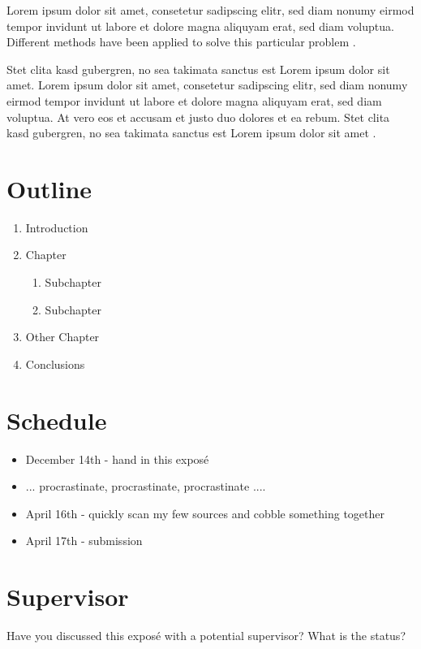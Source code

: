 \documentclass[12pt,a4paper]{article}
\begin{document}
Lorem ipsum dolor sit amet, consetetur sadipscing elitr, sed diam nonumy eirmod tempor invidunt ut labore et dolore magna aliquyam erat, sed diam voluptua. Different methods have been applied to solve this particular problem \autocite[]{McConnell:2004:CCS:1096143,Vandevoorde:2002}. 

Stet clita kasd gubergren, no sea takimata sanctus est Lorem ipsum dolor sit amet. Lorem ipsum dolor sit amet, consetetur sadipscing elitr, sed diam nonumy eirmod tempor invidunt ut labore et dolore magna aliquyam erat, sed diam voluptua. At vero eos et accusam et justo duo dolores et ea rebum. Stet clita kasd gubergren, no sea takimata sanctus est Lorem ipsum dolor sit amet .



\section*{Outline}

\begin{enumerate}
	\item Introduction
	\item Chapter
	\begin{enumerate}
		\item Subchapter
		\item Subchapter
	\end{enumerate}
	\item Other Chapter
	\item Conclusions
\end{enumerate}

\nocite{*}
\printbibliography

\section*{Schedule}

\begin{itemize}
	\item December 14th - hand in this exposé
	\item ... procrastinate, procrastinate, procrastinate ....
	\item April 16th - quickly scan my few sources and cobble something together
	\item April 17th - submission
\end{itemize}

\section*{Supervisor}

Have you discussed this exposé with a potential supervisor?
What is the status?
\end{document}
